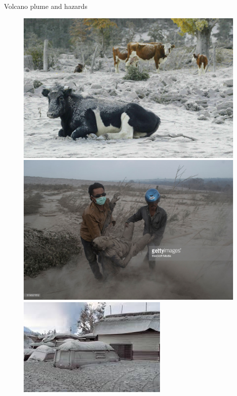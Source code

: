 \documentclass{beamer}
\begin{document}
\begin{frame}{Volcano plume and hazards}
\begin{figure}[!t]
\begin{minipage}{.325\textwidth}
\center
\includegraphics[width=.85\textwidth]{./PPT/Ash_community}
\end{minipage}
\begin{minipage}{.325\textwidth}
\center
\includegraphics[width=.85\textwidth]{./PPT/Ash_community4}
\end{minipage}
\begin{minipage}{.325\textwidth}
\center
\includegraphics[width=.85\textwidth]{./PPT/Ash_community3}

\end{minipage}
\end{figure}
\end{frame}
\end{document}
